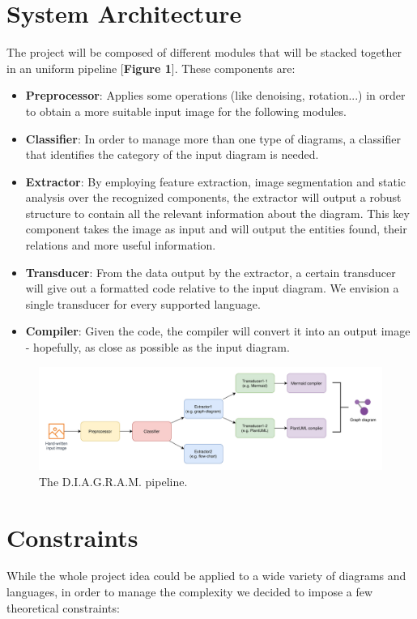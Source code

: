 \documentclass[a4paper,12pt]{article}
\begin{document}
\section{System Architecture}
    The project will be composed of different modules that will be stacked together in an uniform pipeline [\textbf{Figure 1}]. These components are:
    \begin{itemize}
    		\item \textbf{Preprocessor}: Applies some operations (like denoising, rotation...) in order to obtain a more suitable input image for the following modules.
    		\item \textbf{Classifier}: In order to manage more than one type of diagrams, a classifier that identifies the category of the input diagram is needed.
    		\item \textbf{Extractor}: By employing feature extraction, image segmentation and static analysis over the recognized components, the extractor will output a robust structure to contain all the relevant information about the diagram. This key component takes the image as input and will output the entities found, their relations and more useful information.
    		\item \textbf{Transducer}: From the data output by the extractor, a certain transducer will give out a formatted code relative to the input diagram. We envision a single transducer for every supported language.
    		\item \textbf{Compiler}: Given the code, the compiler will convert it into an output image - hopefully, as close as possible as the input diagram.
    \end{itemize}

\begin{figure}[h]
    \centering
    \includegraphics[width=1.2\textwidth]{../assets/images/overview.png} %
    \caption{The D.I.A.G.R.A.M. pipeline.}
\end{figure}

\newpage

\section{Constraints}
While the whole project idea could be applied to a wide variety of diagrams and languages, in order to manage the complexity we decided to impose a few theoretical constraints:
\end{document}

